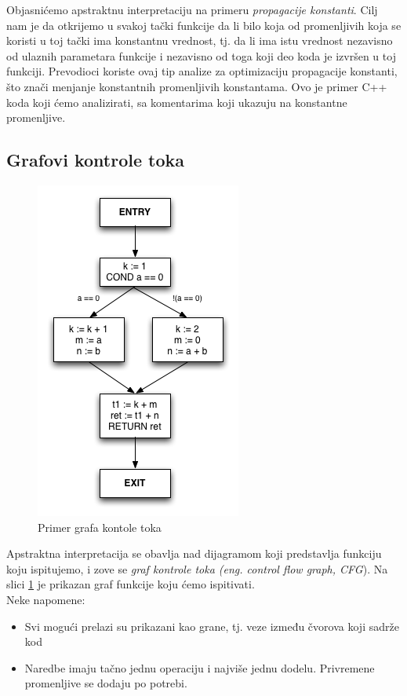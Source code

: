 Objasnićemo apstraktnu interpretaciju na primeru \emph{propagacije konstanti}. 
Cilj nam je da otkrijemo u svakoj tački funkcije da li bilo koja od promenljivih koja se koristi u toj tački ima konstantnu vrednost, tj. da li ima istu vrednost nezavisno od ulaznih parametara funkcije i nezavisno od toga koji deo koda je izvršen u toj funkciji. 
Prevodioci koriste ovaj tip analize za optimizaciju propagacije konstanti, što znači menjanje konstantnih promenljivih konstantama. 
Ovo je primer C++ koda koji ćemo analizirati, sa komentarima koji ukazuju na konstantne promenljive.


\subsection{Grafovi kontrole toka}
\label{subsec:cfgs}

\begin{figure}[H]
\begin{center}
\includegraphics[scale=0.5]{Treehydra-cfg.png}
\end{center}
\caption{Primer grafa kontole toka}
\label{fig:graf}
\end{figure}

Apstraktna interpretacija se obavlja nad dijagramom koji predstavlja funkciju koju ispitujemo, i zove se \emph{graf kontrole toka (eng. control flow graph, CFG}). Na slici \ref{fig:graf} je prikazan graf funkcije koju ćemo ispitivati. \\
Neke napomene:
\begin{itemize}
\item Svi mogući prelazi su prikazani kao grane, tj. veze između čvorova koji sadrže kod
\item Naredbe imaju tačno jednu operaciju i najviše jednu dodelu. Privremene promenljive se dodaju po potrebi.
\end{itemize}

